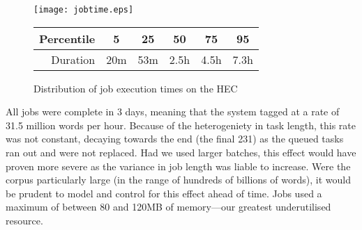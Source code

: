 % 
% 
% 
% 
% 

\begin{figure}[h]
    \centering
    \texttt{[image: jobtime.eps]}

    \begin{tabular}{ | r | c | c | c | c | c | }
        \hline
        Percentile & 5 & 25 & 50 & 75 & 95 \\ \hline
        Duration & 20m & 53m & 2.5h & 4.5h & 7.3h \\ \hline
    \end{tabular}

    \caption{Distribution of job execution times on the HEC}
    \label{fig:jobtimes}
\end{figure}


% 
% 
% 
% 




All jobs were complete in 3 days, meaning that the system tagged at a rate of 31.5 million words 
per hour.  Because of the heterogeniety in task length, this rate was not constant, decaying towards the end (the final 231) as the queued tasks ran out and were not replaced.  Had we used larger batches, this effect would have proven more severe as the variance in job length was liable to increase.  Were the corpus particularly large (in the range of hundreds of billions of words), it would be prudent to model and control for this effect ahead of time.
Jobs used a maximum of between 80 and 120MB of memory---our greatest underutilised resource.

